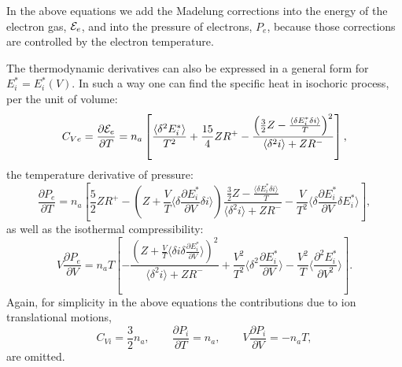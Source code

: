 In the above equations we add the Madelung corrections into the energy of the electron gas, ${\cal E}_e$, and
into the pressure of electrons, $P_e$, because those corrections are controlled by the electron temperature.

The thermodynamic derivatives can also be expressed in a general form for $E^*_i=E^*_i(V)$.
In such a way one can find the specific heat in isochoric process, per the unit of volume:
\begin{equation}\label{generalCv}
C_{Ve}=\frac{\partial {\cal E}_e}{\partial T}=n_a\left[\frac{\langle\delta^2 E^*_i \rangle}{T^2}+\frac{15}4ZR^+
-\frac{\left(\frac32Z-\frac{\langle\delta E^*_i \delta i\rangle}T\right)^2}{\langle\delta^2i\rangle+ZR^-}\right],
\end{equation}
the temperature derivative of pressure:
\begin{equation}\label{generalPT}
\frac {\partial P_e}{\partial T}=
n_a\left[
	\frac52 Z R^+ -
	\left( Z+\frac{V}{T} \langle \delta \frac{\partial E^*_i}{\partial V} \delta i \rangle \right)
		\frac{\frac32Z-\frac{\langle\delta E^*_i \delta i\rangle}T}{\langle\delta^2i\rangle+ZR^-} -
	\frac{V}{T^2} \langle \delta \frac{\partial E^*_i}{\partial V} \delta E^*_i \rangle
\right],
\end{equation}
as well as the isothermal compressibility:
\begin{equation}\label{generalCompr}
V\frac{\partial P_e}{\partial V}=
n_a T \left[ -\frac{\left(Z + \frac{V}{T} \langle \delta i \delta \frac{\partial E^*_i}{\partial V} \rangle \right)^2}
{\langle \delta^2 i \rangle + ZR^-} +
\frac{V^2}{T^2} \langle \delta^2 \frac{\partial E^*_i}{\partial V} \rangle -
\frac{V^2}{T} \langle \frac{\partial^2 E^*_i}{\partial V^2} \rangle
\right].
\end{equation}
Again, for simplicity in the above equations the contributions due to ion translational motions,
\begin{equation}
C_{Vi}=\frac32n_a, \qquad
\frac{\partial P_i}{\partial T}=n_a, \qquad
V\frac{\partial P_i}{\partial V}=-n_aT,
\end{equation}
are omitted.

